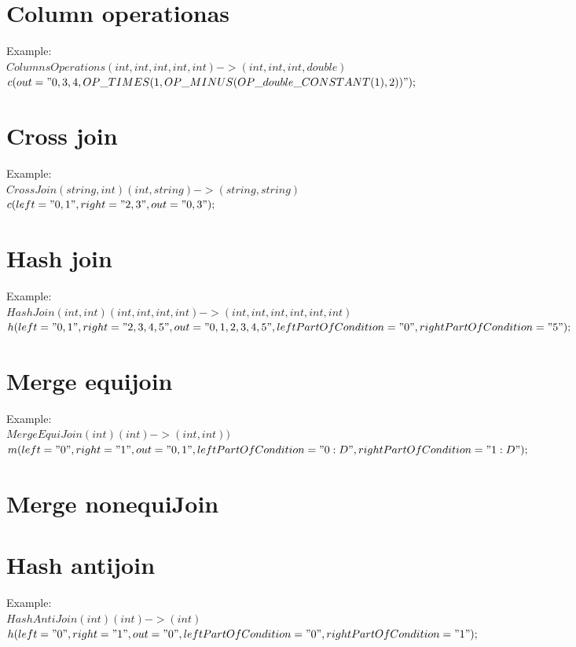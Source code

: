 \documentclass{article}
\begin{document}
\section{Column operationas}
Example: \\  
$ColumnsOperations(int,int,int,int,int)->(int,int,int,double)$ \\
$c(out="0,3,4,OP\_TIMES(1,OP\_MINUS(OP\_double\_CONSTANT(1),2))");$\\ 


\section{Cross join}
Example:\\
$CrossJoin(string,int)(int,string)->(string,string)$\\
$c(left="0,1",right="2,3",out="0,3");$\\

\section{Hash join}
Example:\\
$HashJoin(int,int)(int,int,int,int)->(int,int,int,int,int,int)$\\
$h(left="0,1",right="2,3,4,5",out="0,1,2,3,4,5",leftPartOfCondition="0",rightPartOfCondition="5");$\\ 


\section{Merge equijoin}
Example:\\
$MergeEquiJoin(int)(int)->(int,int))$\\
$m(left="0",right="1",out="0,1",leftPartOfCondition="0:D",rightPartOfCondition="1:D");$\\ 


\section{Merge nonequiJoin}


\section{Hash antijoin}
Example:\\
$HashAntiJoin(int)(int)->(int)$\\
$h(left="0",right="1",out="0",leftPartOfCondition="0",rightPartOfCondition="1");$\\ 
\end{document}
